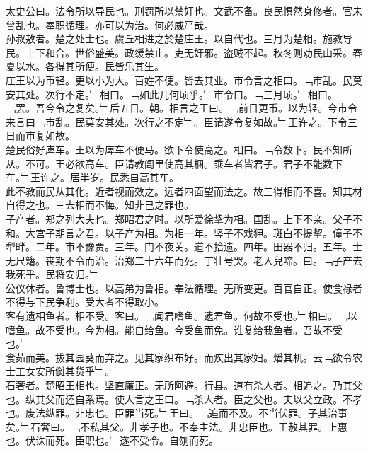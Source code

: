 \documentclass{zhvt-classic}
\begin{document}

\hspace*{2em}太史公曰。法令所以导民也。刑罚所以禁奸也。文武不备。良民惧然身修者。官未曾乱也。奉职循理。亦可以为治。何必威严哉。\\
\hspace*{2em}孙叔敖者。楚之处士也。虞丘相进之於楚庄王。以自代也。三月为楚相。施教导民。上下和合。世俗盛美。政缓禁止。吏无奸邪。盗贼不起。秋冬则劝民山采。春夏以水。各得其所便。民皆乐其生。\\
\hspace*{2em}庄王以为币轻。更以小为大。百姓不便。皆去其业。市令言之相曰。﹁市乱。民莫安其处。次行不定。﹂相曰。﹁如此几何顷乎。﹂市令曰。﹁三月顷。﹂相曰。﹁罢。吾今令之复矣。﹂后五日。朝。相言之王曰。﹁前日更币。以为轻。今市令来言曰﹁市乱。民莫安其处。次行之不定﹂。臣请遂令复如故。﹂王许之。下令三日而市复如故。\\
\hspace*{2em}楚民俗好庳车。王以为庳车不便马。欲下令使高之。相曰。﹁令数下。民不知所从。不可。王必欲高车。臣请教闾里使高其梱。乘车者皆君子。君子不能数下车。﹂王许之。居半岁。民悉自高其车。\\
\hspace*{2em}此不教而民从其化。近者视而效之。远者四面望而法之。故三得相而不喜。知其材自得之也。三去相而不悔。知非己之罪也。\\
\hspace*{2em}子产者。郑之列大夫也。郑昭君之时。以所爱徐挚为相。国乱。上下不亲。父子不和。大宫子期言之君。以子产为相。为相一年。竖子不戏狎。斑白不提挈。僮子不犁畔。二年。市不豫贾。三年。门不夜关。道不拾遗。四年。田器不归。五年。士无尺籍。丧期不令而治。治郑二十六年而死。丁壮号哭。老人兒啼。曰。﹁子产去我死乎。民将安归。﹂\\
\hspace*{2em}公仪休者。鲁博士也。以高弟为鲁相。奉法循理。无所变更。百官自正。使食禄者不得与下民争利。受大者不得取小。\\
\hspace*{2em}客有遗相鱼者。相不受。客曰。﹁闻君嗜鱼。遗君鱼。何故不受也。﹂相曰。﹁以嗜鱼。故不受也。今为相。能自给鱼。今受鱼而免。谁复给我鱼者。吾故不受也。﹂\\
\hspace*{2em}食茹而美。拔其园葵而弃之。见其家织布好。而疾出其家妇。燔其机。云﹁欲令农士工女安所雠其货乎﹂。\\
\hspace*{2em}石奢者。楚昭王相也。坚直廉正。无所阿避。行县。道有杀人者。相追之。乃其父也。纵其父而还自系焉。使人言之王曰。﹁杀人者。臣之父也。夫以父立政。不孝也。废法纵罪。非忠也。臣罪当死。﹂王曰。﹁追而不及。不当伏罪。子其治事矣。﹂石奢曰。﹁不私其父。非孝子也。不奉主法。非忠臣也。王赦其罪。上惠也。伏诛而死。臣职也。﹂遂不受令。自刎而死。\\
\end{document}
